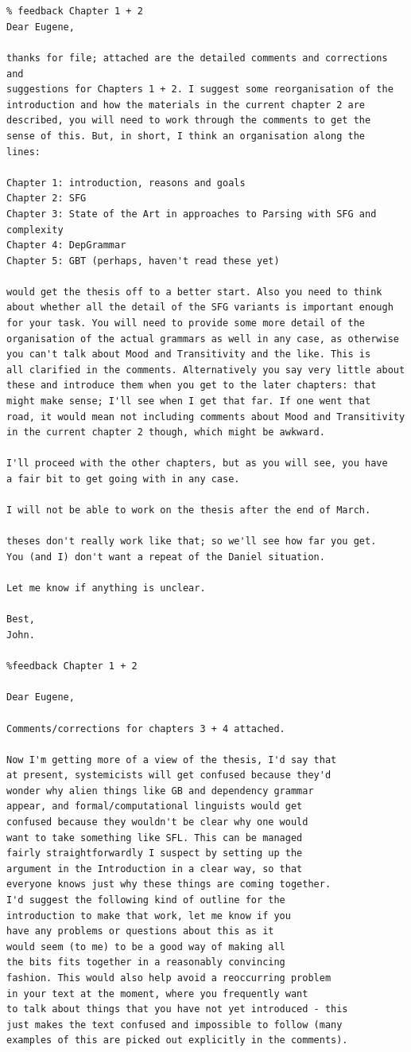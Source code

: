 \begin{Verbatim}


% feedback Chapter 1 + 2
Dear Eugene,

thanks for file; attached are the detailed comments and corrections and
suggestions for Chapters 1 + 2. I suggest some reorganisation of the
introduction and how the materials in the current chapter 2 are described, you will need to work through the comments to get the
sense of this. But, in short, I think an organisation along the
lines:

Chapter 1: introduction, reasons and goals
Chapter 2: SFG
Chapter 3: State of the Art in approaches to Parsing with SFG and complexity
Chapter 4: DepGrammar
Chapter 5: GBT (perhaps, haven't read these yet)

would get the thesis off to a better start. Also you need to think
about whether all the detail of the SFG variants is important enough
for your task. You will need to provide some more detail of the
organisation of the actual grammars as well in any case, as otherwise
you can't talk about Mood and Transitivity and the like. This is
all clarified in the comments. Alternatively you say very little about
these and introduce them when you get to the later chapters: that
might make sense; I'll see when I get that far. If one went that
road, it would mean not including comments about Mood and Transitivity
in the current chapter 2 though, which might be awkward.

I'll proceed with the other chapters, but as you will see, you have
a fair bit to get going with in any case.

I will not be able to work on the thesis after the end of March. 

theses don't really work like that; so we'll see how far you get.
You (and I) don't want a repeat of the Daniel situation.

Let me know if anything is unclear.

Best,
John.

%feedback Chapter 1 + 2

Dear Eugene,

Comments/corrections for chapters 3 + 4 attached.

Now I'm getting more of a view of the thesis, I'd say that
at present, systemicists will get confused because they'd
wonder why alien things like GB and dependency grammar
appear, and formal/computational linguists would get
confused because they wouldn't be clear why one would
want to take something like SFL. This can be managed
fairly straightforwardly I suspect by setting up the
argument in the Introduction in a clear way, so that
everyone knows just why these things are coming together.
I'd suggest the following kind of outline for the
introduction to make that work, let me know if you
have any problems or questions about this as it
would seem (to me) to be a good way of making all
the bits fits together in a reasonably convincing
fashion. This would also help avoid a reoccurring problem
in your text at the moment, where you frequently want
to talk about things that you have not yet introduced - this
just makes the text confused and impossible to follow (many
examples of this are picked out explicitly in the comments).


\end{Verbatim}
